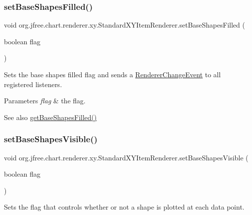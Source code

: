 \subsubsection{\texorpdfstring{set\+Base\+Shapes\+Filled()}{setBaseShapesFilled()}}
{\footnotesize\ttfamily void org.\+jfree.\+chart.\+renderer.\+xy.\+Standard\+X\+Y\+Item\+Renderer.\+set\+Base\+Shapes\+Filled (\begin{DoxyParamCaption}\item[{boolean}]{flag }\end{DoxyParamCaption})}

Sets the base \textquotesingle{}shapes filled\textquotesingle{} flag and sends a \mbox{\hyperlink{}{Renderer\+Change\+Event}} to all registered listeners.


\begin{DoxyParams}{Parameters}
{\em flag} & the flag.\\
\hline
\end{DoxyParams}
\begin{DoxySeeAlso}{See also}
\mbox{\hyperlink{classorg_1_1jfree_1_1chart_1_1renderer_1_1xy_1_1_standard_x_y_item_renderer_adb39a465a8e460f4accac823465c4ab5}{get\+Base\+Shapes\+Filled()}} 
\end{DoxySeeAlso}
\mbox{\label{classorg_1_1jfree_1_1chart_1_1renderer_1_1xy_1_1_standard_x_y_item_renderer_a6bf86f870ebd05fcf10790431c04f29f}} 
\subsubsection{\texorpdfstring{set\+Base\+Shapes\+Visible()}{setBaseShapesVisible()}}
{\footnotesize\ttfamily void org.\+jfree.\+chart.\+renderer.\+xy.\+Standard\+X\+Y\+Item\+Renderer.\+set\+Base\+Shapes\+Visible (\begin{DoxyParamCaption}\item[{boolean}]{flag }\end{DoxyParamCaption})}

Sets the flag that controls whether or not a shape is plotted at each data point.


